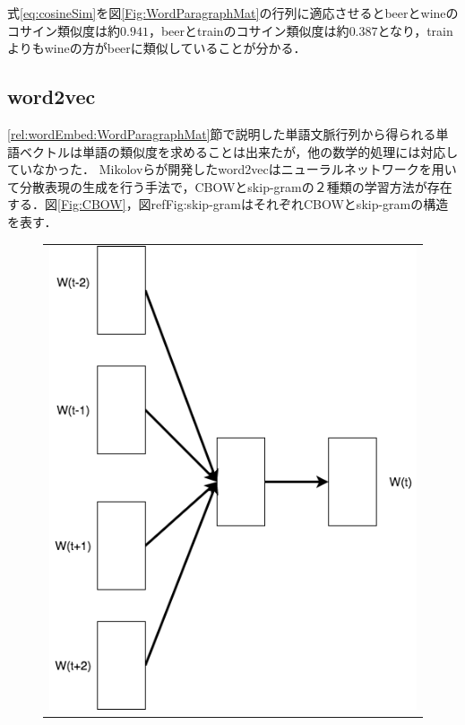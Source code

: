 式\ref{eq:cosineSim}を図\ref{Fig:WordParagraphMat}の行列に適応させるとbeerとwineのコサイン類似度は約$0.941$，beerとtrainのコサイン類似度は約$0.387$となり，trainよりもwineの方がbeerに類似していることが分かる．
\subsection{word2vec}
\ref{rel:wordEmbed:WordParagraphMat}節で説明した単語文脈行列から得られる単語ベクトルは単語の類似度を求めることは出来たが，他の数学的処理には対応していなかった．
Mikolovら\cite{word2vec}が開発したword2vecはニューラルネットワークを用いて分散表現の生成を行う手法で，CBOWとskip-gramの２種類の学習方法が存在する．図\ref{Fig:CBOW}，図ref{Fig:skip-gram}はそれぞれCBOWとskip-gramの構造を表す．
\begin{figure}[htbp]
	\begin{center}
	\begin{tabular}{c}
      		\begin{minipage}{0.5\textwidth}
       		 \begin{center}
 	 		\includegraphics[width=\hsize]{../images/2.Related_Work/CBOW.png}

\end{center}
\end{minipage}
\end{tabular}
\end{center}
\end{figure}

